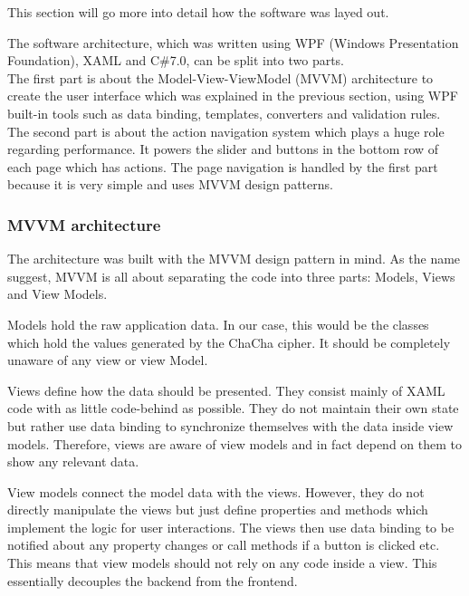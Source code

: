 This section will go more into detail how the software was layed out.

\noindent
The software architecture, which was written using WPF (Windows Presentation Foundation), XAML and C\#7.0, can be split into two parts. \\
The first part is about the Model-View-ViewModel (MVVM) architecture to create the user interface which was explained in the previous section, using WPF built-in tools such as data binding, templates, converters and validation rules. \\
The second part is about the action navigation system which plays a huge role regarding performance. It powers the slider and buttons in the bottom row of each page which has actions. The page navigation is handled by the first part because it is very simple and uses MVVM design patterns.

\subsubsection{MVVM architecture}

The architecture was built with the MVVM design pattern in mind. As the name suggest, MVVM is all about separating the code into three parts: Models, Views and View Models.

Models hold the raw application data. In our case, this would be the classes which hold the values generated by the ChaCha cipher. It should be completely unaware of any view or view Model.

Views define how the data should be presented. They consist mainly of XAML code with as little code-behind as possible. They do not maintain their own state but rather use data binding to synchronize themselves with the data inside view models. Therefore, views are aware of view models and in fact depend on them to show any relevant data.

View models connect the model data with the views. However, they do not directly manipulate the views but just define properties and methods which implement the logic for user interactions. The views then use data binding to be notified about any property changes or call methods if a button is clicked etc. This means that view models should not rely on any code inside a view. This essentially decouples the backend from the frontend.

